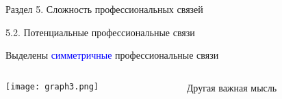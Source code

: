 \begin{frame}{Раздел 5. Сложность профессиональных связей}

{\large 5.2. Потенциальные профессиональные связи}

\small
Выделены \textcolor{blue}{симметричные} профессиональные связи

\begin{columns}[T] %
\begin{column}{0.7\textwidth} %
\centering
          \texttt{[image: graph3.png]}
\end{column}
\begin{column}{0.3\textwidth} %
Другая важная мысль
\end{column}
\end{columns}
\end{frame}


